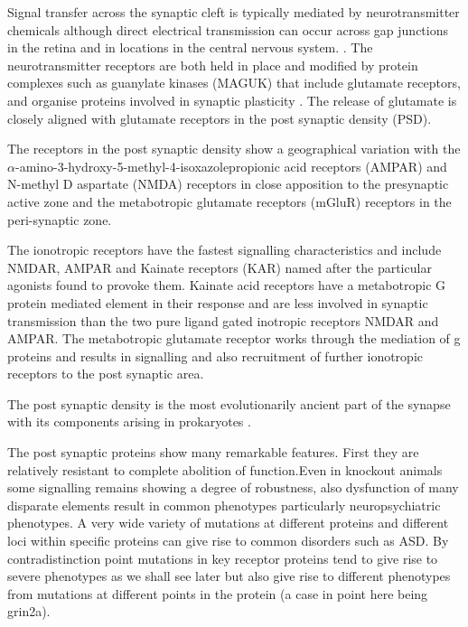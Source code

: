 Signal transfer across the synaptic cleft is typically mediated by neurotransmitter chemicals although direct electrical transmission can occur across gap junctions in the retina and in locations in the central nervous system.  \cite{stewart2014structure}. The neurotransmitter receptors are both held in place and modified by protein complexes such as guanylate kinases (MAGUK) that include glutamate receptors, and organise proteins involved in synaptic plasticity \cite{zhu2016mechanistic}. The release of glutamate is closely aligned with glutamate receptors in the post synaptic density (PSD). \cite{harris2012ultrastructure}

 The receptors in the post synaptic density show a geographical variation with the  $\alpha$-amino-3-hydroxy-5-methyl-4-isoxazolepropionic acid  receptors (AMPAR) and N-methyl D aspartate (NMDA) receptors in close apposition to the presynaptic active zone and the metabotropic glutamate receptors (mGluR) receptors in the peri-synaptic zone.\cite{scheefhals2018functional} 
 
 The ionotropic receptors have the fastest signalling characteristics and include NMDAR, AMPAR and Kainate receptors (KAR) named after the particular agonists found to provoke them. Kainate acid receptors have a metabotropic G protein mediated element in their response and are less involved in synaptic transmission \cite{contractor2011kainate} than the two pure ligand gated inotropic receptors NMDAR and AMPAR.  The metabotropic glutamate receptor works through the mediation of g proteins and results in signalling and also recruitment of further ionotropic receptors to the post synaptic area. 
 
 The post synaptic density is the most evolutionarily ancient part of the synapse with its components arising in prokaryotes\cite{grant2018synapse} \cite{emes2012evolution}. 


The post synaptic proteins show many remarkable features. First they are relatively resistant to complete abolition of function.Even in knockout animals some signalling remains showing a degree of robustness, also dysfunction of many disparate elements result in common phenotypes particularly neuropsychiatric phenotypes. A very wide variety of mutations at different proteins and different loci within specific proteins can give rise to common disorders such as ASD. By contradistinction point mutations in key receptor proteins tend to give rise to severe phenotypes as we shall see later but also give rise to different phenotypes from mutations at different points in the protein (a case in point here being grin2a).

